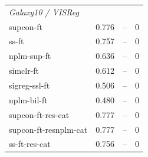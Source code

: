 \begin{center}
\begin{longtable}{lccc}
\multicolumn{4}{l}{\emph{Galaxy10 / VISReg}} \\
\quad supcon-ft & 0.776 & -- & 0 \\
\quad ss-ft & 0.757 & -- & 0 \\
\quad nplm-sup-ft & 0.636 & -- & 0 \\
\quad simclr-ft & 0.612 & -- & 0 \\
\quad sigreg-ssl-ft & 0.506 & -- & 0 \\
\quad nplm-bil-ft & 0.480 & -- & 0 \\
\quad supcon-ft-res-cat & 0.777 & -- & 0 \\
\quad supcon-ft-resnplm-cat & 0.777 & -- & 0 \\
\quad ss-ft-res-cat & 0.756 & -- & 0 \\
\end{longtable}
\end{center}
